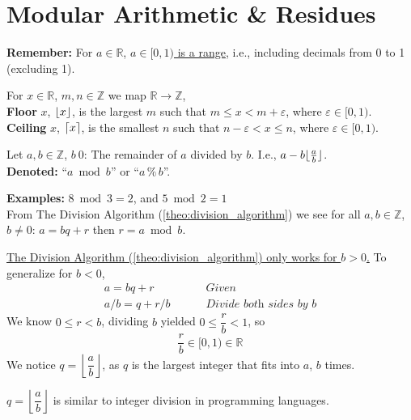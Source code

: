 \section{Modular Arithmetic \& Residues}
\noindent
\textbf{Remember:} For $a\in\mathbb{R}$, \underline {$a\in[0,1)$ is a range}, i.e., including decimals from 0 to 1 (excluding 1).\\
\begin{Def}

    \label{def:floor_ceiling}

    For $x\in\mathbb{R}$, $m,n\in\mathbb{Z}$ we map $\mathbb{R}\rightarrow\mathbb{Z}$,\\

    \noindent
    \textbf{Floor} $x$, $\lfloor x\rfloor$, is the largest $m$ such that $m\leq x<m+\varepsilon$, where $\varepsilon\in[0,1)$.\\

    \vspace{-.5em}
    \noindent
    \textbf{Ceiling} $x$, $\lceil x\rceil$, is the smallest $n$ such that $n-\varepsilon<x\leq n$, where $\varepsilon\in[0,1)$.\\


\end{Def}
\noindent

\begin{Def}

    \label{def:mod_operator}

    Let $a,b\in\mathbb{Z}$, $b\>0$: The remainder of $a$ divided by $b$. I.e., $a-b\lfloor\frac{a}{b}\rfloor$.\\

    \noindent
    \textbf{Denoted:} ``$a\bmod b$'' or ``$a\,\%\,b$''.
\end{Def}

\noindent
\textbf{Examples:} $8\bmod3=2$, and $5\bmod2=1$\\

\noindent
From The Division Algorithm (\ref{theo:division_algorithm}) we see for all $a,b\in\mathbb{Z}$, $b\neq0$:
$a=bq+r$ then $r=a\bmod b$.

\begin{Proof}
    \underline{The Division Algorithm (\ref{theo:division_algorithm}) only works for $b>0$.} To generalize for $b<0$,
    \begin{align*}
        a=bq+r \quad \quad    & \textit{ Given}                    \\
        a/b=q+r/b \quad \quad & \textit{ Divide both sides by $b$}
    \end{align*}
    \noindent
    We know $0\leq r<b$, dividing $b$ yielded $0\leq \dfrac{r}{b}<1$, so
    $$\dfrac{r}{b}\in[0,1)\in\mathbb{R}$$
    We notice $q=\left\lfloor\dfrac{a}{b}\right\rfloor$, as $q$ is the largest integer that fits into $a$, $b$ times.
\end{Proof}
\begin{Tip}
    $q=\left\lfloor\dfrac{a}{b}\right\rfloor$ is similar to integer division in programming languages.
\end{Tip}

